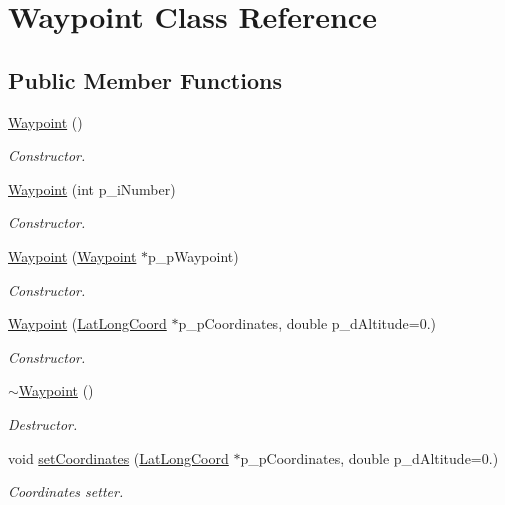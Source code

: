 \hypertarget{class_waypoint}{\section{Waypoint Class Reference}
\label{class_waypoint}
}
\subsection*{Public Member Functions}
\begin{DoxyCompactItemize}
\item 
\hyperlink{class_waypoint_aa063fce5db492e5adfa232f026a27367}{Waypoint} ()
\begin{DoxyCompactList}\small\item\em Constructor. \end{DoxyCompactList}\item 
\hyperlink{class_waypoint_a95fc87838d3933a13dbfb1d9204510fb}{Waypoint} (int p\-\_\-i\-Number)
\begin{DoxyCompactList}\small\item\em Constructor. \end{DoxyCompactList}\item 
\hyperlink{class_waypoint_ab3bf82fa2c2da06d39be7198c84df72b}{Waypoint} (\hyperlink{class_waypoint}{Waypoint} $\ast$p\-\_\-p\-Waypoint)
\begin{DoxyCompactList}\small\item\em Constructor. \end{DoxyCompactList}\item 
\hyperlink{class_waypoint_a32c284680e49c95c108b44995254ecee}{Waypoint} (\hyperlink{class_lat_long_coord}{Lat\-Long\-Coord} $\ast$p\-\_\-p\-Coordinates, double p\-\_\-d\-Altitude=0.)
\begin{DoxyCompactList}\small\item\em Constructor. \end{DoxyCompactList}\item 
\hyperlink{class_waypoint_af87987c65467f66eb3955ba55e50d3db}{$\sim$\-Waypoint} ()
\begin{DoxyCompactList}\small\item\em Destructor. \end{DoxyCompactList}\item 
void \hyperlink{class_waypoint_a20763364294dee742c9c992bbfcdac8c}{set\-Coordinates} (\hyperlink{class_lat_long_coord}{Lat\-Long\-Coord} $\ast$p\-\_\-p\-Coordinates, double p\-\_\-d\-Altitude=0.)
\begin{DoxyCompactList}\small\item\em Coordinates setter. \end{DoxyCompactList}\item 

\end{DoxyCompactItemize}
